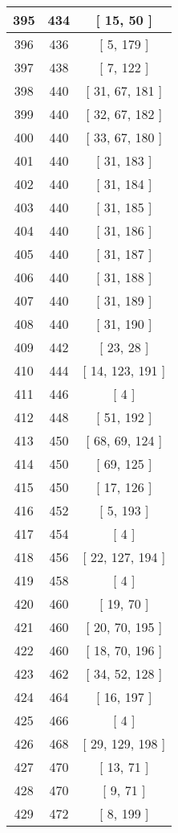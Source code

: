 \begin{center}
\begin{longtable}[H]{|| c c c ||}
\hline
395 & 434 & [ 15, 50 ] \\ 
\hline
396 & 436 & [ 5, 179 ] \\ 
\hline
397 & 438 & [ 7, 122 ] \\ 
\hline
398 & 440 & [ 31, 67, 181 ] \\ 
\hline
399 & 440 & [ 32, 67, 182 ] \\ 
\hline
400 & 440 & [ 33, 67, 180 ] \\ 
\hline
401 & 440 & [ 31, 183 ] \\ 
\hline
402 & 440 & [ 31, 184 ] \\ 
\hline
403 & 440 & [ 31, 185 ] \\ 
\hline
404 & 440 & [ 31, 186 ] \\ 
\hline
405 & 440 & [ 31, 187 ] \\ 
\hline
406 & 440 & [ 31, 188 ] \\ 
\hline
407 & 440 & [ 31, 189 ] \\ 
\hline
408 & 440 & [ 31, 190 ] \\ 
\hline
409 & 442 & [ 23, 28 ] \\ 
\hline
410 & 444 & [ 14, 123, 191 ] \\ 
\hline
411 & 446 & [ 4 ] \\ 
\hline
412 & 448 & [ 51, 192 ] \\ 
\hline
413 & 450 & [ 68, 69, 124 ] \\ 
\hline
414 & 450 & [ 69, 125 ] \\ 
\hline
415 & 450 & [ 17, 126 ] \\ 
\hline
416 & 452 & [ 5, 193 ] \\ 
\hline
417 & 454 & [ 4 ] \\ 
\hline
418 & 456 & [ 22, 127, 194 ] \\ 
\hline
419 & 458 & [ 4 ] \\ 
\hline
420 & 460 & [ 19, 70 ] \\ 
\hline
421 & 460 & [ 20, 70, 195 ] \\ 
\hline
422 & 460 & [ 18, 70, 196 ] \\ 
\hline
423 & 462 & [ 34, 52, 128 ] \\ 
\hline
424 & 464 & [ 16, 197 ] \\ 
\hline
425 & 466 & [ 4 ] \\ 
\hline
426 & 468 & [ 29, 129, 198 ] \\ 
\hline
427 & 470 & [ 13, 71 ] \\ 
\hline
428 & 470 & [ 9, 71 ] \\ 
\hline
429 & 472 & [ 8, 199 ] \\ 

\end{longtable}
\end{center}
